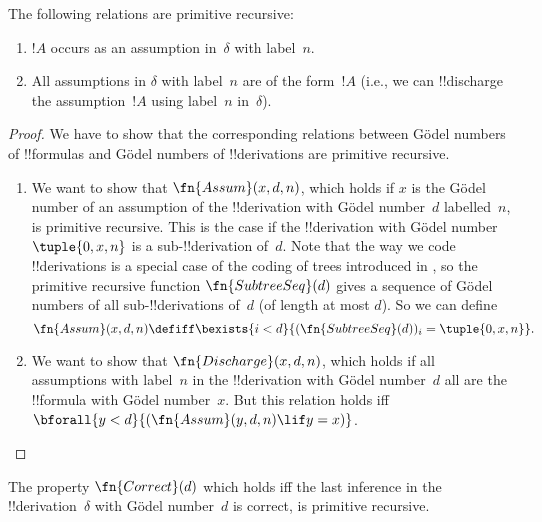 \documentclass[../../../include/open-logic-section]{subfiles}
\begin{document}
\begin{prop}
  The following relations are primitive recursive:
  \begin{enumerate}
  \item $!A$ occurs as an assumption in~$\delta$ with label~$n$.
  \item All assumptions in $\delta$ with label~$n$ are of the form~$!A$
    (i.e., we can !!{discharge} the assumption~$!A$ using label~$n$
    in~$\delta$).
  \end{enumerate}
\end{prop}

\begin{proof}
  We have to show that the corresponding relations between G\"odel
  numbers of !!{formula}s and G\"odel numbers of !!{derivation}s are
  primitive recursive.
  \begin{enumerate}
  \item We want to show that $\fn{Assum}(x, d, n)$, which holds if $x$
    is the G\"odel number of an assumption of the !!{derivation} with
    G\"odel number~$d$ labelled~$n$, is primitive recursive.  This is
    the case if the !!{derivation} with G\"odel number~$\tuple{0, x,
      n}$ is a sub-!!{derivation} of~$d$. Note that the way we code
    !!{derivation}s is a special case of the coding of trees introduced in
    , so the primitive recursive function
    $\fn{SubtreeSeq}(d)$ gives a sequence of G\"odel numbers of all
    sub-!!{derivation}s of~$d$ (of length at most $d$). So we can
    define
    \[
    \fn{Assum}(x, d, n) \defiff \bexists{i<d}{(\fn{SubtreeSeq}(d))_i =
      \tuple{0, x, n}}.
    \]
  \item We want to show that $\fn{Discharge}(x, d, n)$, which holds if
    all assumptions with label~$n$ in the !!{derivation} with G\"odel
    number~$d$ all are the !!{formula} with G\"odel number~$x$.  But
    this relation holds iff $\bforall{y<d}{(\fn{Assum}(y, d, n) \lif y
      = x)}$.
  \end{enumerate}
\end{proof}

\begin{prop}
  The property $\fn{Correct}(d)$ which holds iff the last inference in
  the !!{derivation}~$\delta$ with G\"odel number~$d$ is correct, is
  primitive recursive.
\end{prop}
\end{document}
